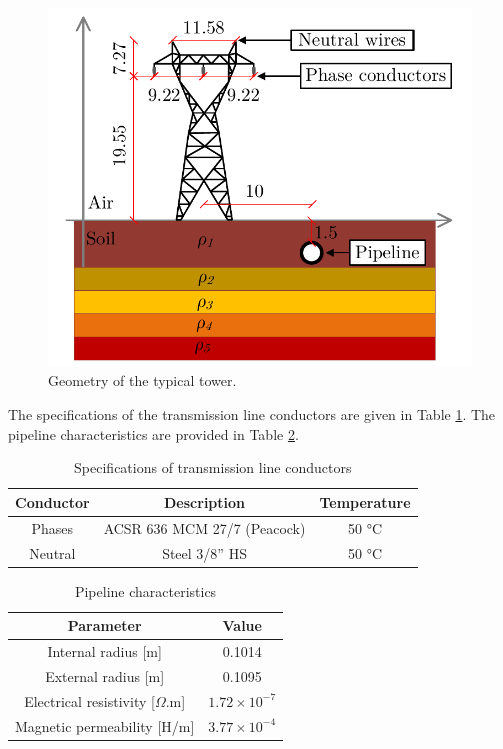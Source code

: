 \documentclass[conference]{IEEEtran}
\begin{document}
\begin{figure}[hbt]
	\begin{center}
		\includegraphics[width=.8\columnwidth]{fig/SistTesteCorte.pdf}
		\caption{Geometry of the typical tower.}
		\label{fig:SistTesteCorte}
	\end{center}
\end{figure}

The specifications of the transmission line conductors  are given in Table \ref{table:LTCond}. The pipeline characteristics are provided in Table \ref{table:PipeParam}.

\begin{table}[!hbt]
	\renewcommand{\arraystretch}{1.3}
	\caption{Specifications of transmission line conductors}
	\label{table:LTCond}
	\centering
	\begin{tabular}{|c|c|c|}
		\hline
		\textbf{Conductor} & \textbf{Description} & \textbf{Temperature} \\
		\hline
		Phases & ACSR 636 MCM 27/7 (Peacock) & 50 °C\\
		\hline
		Neutral & Steel 3/8” HS & 50 °C\\
		\hline
	\end{tabular}
\end{table}

\begin{table}[!hbt]
	\renewcommand{\arraystretch}{1.3}
	\caption{Pipeline characteristics}
	\label{table:PipeParam}
	\centering
	\begin{tabular}{|c|c|}
		\hline
		\textbf{Parameter} & \textbf{Value} \\
		\hline
		Internal radius [m] & 0.1014\\
		\hline
		External radius [m] & 0.1095\\
		\hline
		Electrical resistivity [$\Omega$.m] & $1.72\times10^{-7}$\\
		\hline
		Magnetic permeability [H/m] & $3.77\times10^{-4}$\\
		\hline
	\end{tabular}
\end{table}
\end{document}
